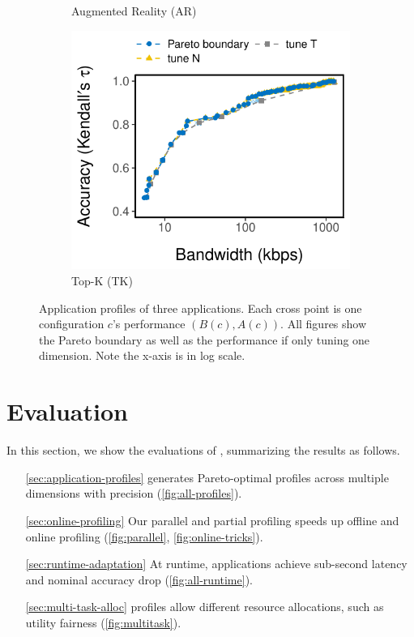 \begin{figure}[htb]
\begin{subfigure}[t]{0.32\textwidth}
    \caption{Augmented Reality (AR)}
    \label{fig:ar-profile}
  \end{subfigure}
  \hfill
  \begin{subfigure}[t]{0.32\textwidth}
    \centering
    \includegraphics[width=\textwidth]{figures/profile-topk.pdf}
    \caption{Top-K (TK)}
    \label{fig:tk-profile}
  \end{subfigure}
  \caption{Application profiles of three applications. Each cross point is one
    configuration $c$'s performance $(B(c), A(c))$. All figures show the Pareto
    boundary as well as the performance if only tuning one dimension. Note the
    x-axis is in log scale.}
  \label{fig:all-profiles}
\end{figure}

\newpage

\section{Evaluation}
\label{sec:evaluation}

In this section, we show the evaluations of \sysname{}, summarizing the results
as follows.

\begin{itemize}
\item[\autoref{sec:application-profiles}] \sysname{} generates Pareto-optimal
  profiles across multiple dimensions with precision
  (\autoref{fig:all-profiles}).
\item[\autoref{sec:online-profiling}] Our parallel and partial profiling speeds
  up offline and online profiling (\autoref{fig:parallel},
  \autoref{fig:online-tricks}).
\item[\autoref{sec:runtime-adaptation}] At runtime, \sysname{} applications
  achieve sub-second latency and nominal accuracy drop
  (\autoref{fig:all-runtime}).
\item[\autoref{sec:multi-task-alloc}] \sysname{} profiles allow different
  resource allocations, such as utility fairness (\autoref{fig:multitask}).
\end{itemize}

